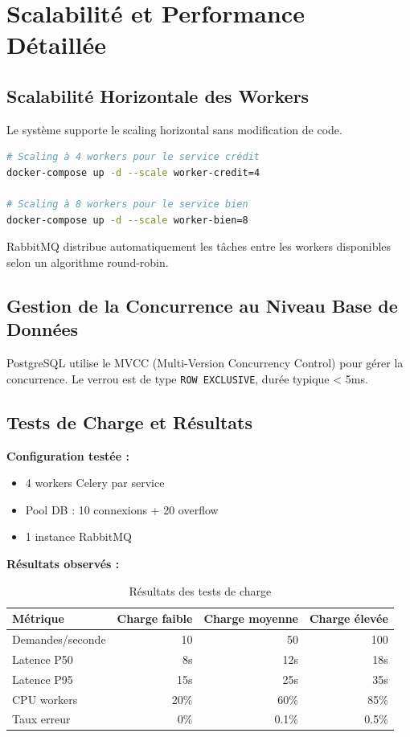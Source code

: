 \documentclass[12pt,a4paper]{article}
\begin{document}
\section{Scalabilité et Performance Détaillée}

\subsection{Scalabilité Horizontale des Workers}

Le système supporte le scaling horizontal sans modification de code.

\begin{lstlisting}[language=bash]
# Scaling à 4 workers pour le service crédit
docker-compose up -d --scale worker-credit=4

# Scaling à 8 workers pour le service bien
docker-compose up -d --scale worker-bien=8
\end{lstlisting}

RabbitMQ distribue automatiquement les tâches entre les workers disponibles selon un algorithme round-robin.

\subsection{Gestion de la Concurrence au Niveau Base de Données}

PostgreSQL utilise le MVCC (Multi-Version Concurrency Control) pour gérer la concurrence. Le verrou est de type \texttt{ROW EXCLUSIVE}, durée typique < 5ms.

\subsection{Tests de Charge et Résultats}

\textbf{Configuration testée :}
\begin{itemize}
    \item 4 workers Celery par service
    \item Pool DB : 10 connexions + 20 overflow
    \item 1 instance RabbitMQ
\end{itemize}

\textbf{Résultats observés :}

\begin{table}[H]
\centering
\begin{tabular}{lrrr}
\toprule
\textbf{Métrique} & \textbf{Charge faible} & \textbf{Charge moyenne} & \textbf{Charge élevée} \\
\midrule
Demandes/seconde & 10 & 50 & 100 \\
Latence P50 & 8s & 12s & 18s \\
Latence P95 & 15s & 25s & 35s \\
CPU workers & 20\% & 60\% & 85\% \\
Taux erreur & 0\% & 0.1\% & 0.5\% \\
\bottomrule
\end{tabular}
\caption{Résultats des tests de charge}
\end{table}
\end{document}
